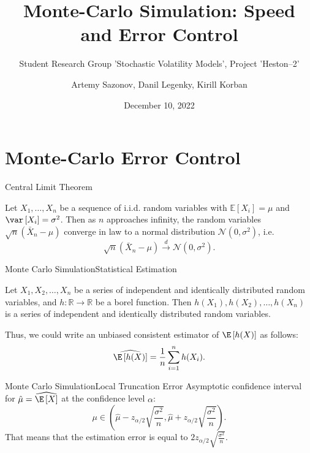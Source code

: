 \documentclass[aspectratio=169]{beamer}
\subtitle{Student Research Group 'Stochastic Volatility Models', Project 'Heston--2'}
\title{Monte-Carlo Simulation: Speed and Error Control}
\author{Artemy Sazonov, Danil Legenky, Kirill Korban}
\institute{Lomonosov Moscow State Univesity, Faculty of Mechanics and Mathematics}
\date{December 10, 2022}
\newcommand{\cN}{\mathcal{N}}
\begin{document}
    \maketitle

    \section{Monte-Carlo Error Control}
        \begin{frame}{Central Limit Theorem}
            \begin{theorem}
                Let $X_1, \dots, X_n$ be a sequence of i.i.d. random variables with $\mathbb{E}[X_i] = \mu$ and $\var\left[X_i\right] = \sigma^2$. 
                Then as $n$ approaches infinity, the random variables $\sqrt{n}(\bar{X}_n - \mu)$ converge in law to a normal distribution $\cN(0, \sigma^2)$, i.e.
                \begin{equation}
                    \sqrt{n}\left(\bar{X}_n - \mu\right) \xrightarrow{d} \cN\left(0,\sigma^2\right).
                \end{equation}
            \end{theorem}
        \end{frame}
        \begin{frame}{Monte Carlo Simulation}{Statistical Estimation}
            \begin{lemma}
                Let $X_1, X_2, \dots, X_n$ be a series of independent and identically distributed random variables, and $h: \mathbb{R} \to \mathbb{R}$ be a borel function. Then $h(X_1), h(X_2), \dots, h(X_n)$ is a series of independent and identically distributed random variables.
            \end{lemma}
            Thus, we could write an unbiased consistent estimator of $\E \left[h(X)\right]$ as follows:
            \begin{equation}
                \widehat{\E \left[h(X)\right]} = \frac{1}{n} \sum_{i=1}^n h(X_i).
            \end{equation}
        \end{frame}

        \begin{frame}{Monte Carlo Simulation}{Local Truncation Error}
            Asymptotic confidence interval for $\hat{\mu} = \widehat{\E\left[X\right]}$ at the confidence level $\alpha$:
            \begin{equation}
                \mu \in \left(\hat{\mu} - z_{\alpha/2} \sqrt{\frac{\sigma^2}{n}}, \hat{\mu} + z_{\alpha/2} \sqrt{\frac{\sigma^2}{n}}\right).
            \end{equation}
            That means that the estimation error is equal to $2z_{\alpha/2} \sqrt{\frac{\sigma^2}{n}}$.
        \end{frame}
\end{document}
